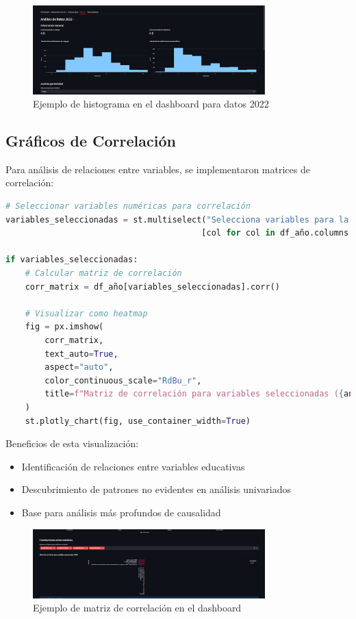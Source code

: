 \begin{figure}[h]
    \centering
    \includegraphics[width=0.8\textwidth]{../imagenes/analisis 2022.png}
    \caption{Ejemplo de histograma en el dashboard para datos 2022}
    \label{fig:histograma}
\end{figure}

\subsection{Gráficos de Correlación}
Para análisis de relaciones entre variables, se implementaron matrices de correlación:

\begin{lstlisting}[language=Python, caption=Implementación de matrices de correlación]
# Seleccionar variables numéricas para correlación
variables_seleccionadas = st.multiselect("Selecciona variables para la correlación:", 
                                        [col for col in df_año.columns if df_año[col].dtype in ['int64', 'float64']])

if variables_seleccionadas:
    # Calcular matriz de correlación
    corr_matrix = df_año[variables_seleccionadas].corr()
    
    # Visualizar como heatmap
    fig = px.imshow(
        corr_matrix,
        text_auto=True,
        aspect="auto",
        color_continuous_scale="RdBu_r",
        title=f"Matriz de correlación para variables seleccionadas ({anio_seleccionado})"
    )
    st.plotly_chart(fig, use_container_width=True)
\end{lstlisting}

Beneficios de esta visualización:
\begin{itemize}
    \item Identificación de relaciones entre variables educativas
    \item Descubrimiento de patrones no evidentes en análisis univariados
    \item Base para análisis más profundos de causalidad
\end{itemize}

\begin{figure}[h]
    \centering
    \includegraphics[width=0.8\textwidth]{../imagenes/correlaciones entre variables.png}
    \caption{Ejemplo de matriz de correlación en el dashboard}
    \label{fig:matriz_correlacion}
\end{figure}

